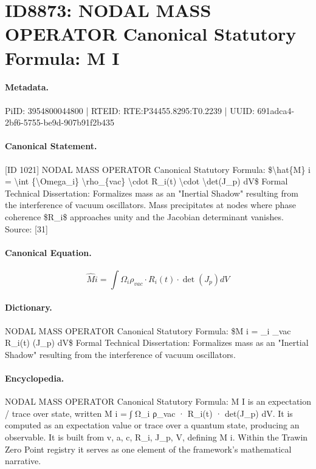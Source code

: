 \section*{ID8873: NODAL MASS OPERATOR Canonical Statutory Formula: M I}
\paragraph{Metadata.}
PiID: 3954800044800 | RTEID: RTE:P34455.8295:T0.2239 | UUID: 691adca4-2bf6-5755-be9d-907b91f2b435

\paragraph{Canonical Statement.}
[ID 1021] NODAL MASS OPERATOR Canonical Statutory Formula: \$\textbackslash{}hat\{M\} i = \textbackslash{}int \{\textbackslash{}Omega\_i\} \textbackslash{}rho\_\{vac\} \textbackslash{}cdot R\_i(t) \textbackslash{}cdot \textbackslash{}det(J\_p) dV\$ Formal Technical Dissertation: Formalizes mass as an "Inertial Shadow" resulting from the interference of vacuum oscillators. Mass precipitates at nodes where phase coherence \$R\_i\$ approaches unity and the Jacobian determinant vanishes. Source: [31]

\paragraph{Canonical Equation.}
\[
\hat{M} i = \int {\Omega_i} \rho_{vac} \cdot R_i(t) \cdot \det(J_p) dV
\]

\paragraph{Dictionary.}
NODAL MASS OPERATOR Canonical Statutory Formula: \$M i = \_i \_vac R\_i(t) (J\_p) dV\$ Formal Technical Dissertation: Formalizes mass as an "Inertial Shadow" resulting from the interference of vacuum oscillators.

\paragraph{Encyclopedia.}
NODAL MASS OPERATOR Canonical Statutory Formula: M I is an expectation / trace over state, written M i = ∫ Ω\_i ρ\_vac · R\_i(t) · det(J\_p) dV. It is computed as an expectation value or trace over a quantum state, producing an observable. It is built from v, a, c, R\_i, J\_p, V, defining M i. Within the Trawin Zero Point registry it serves as one element of the framework's mathematical narrative.
